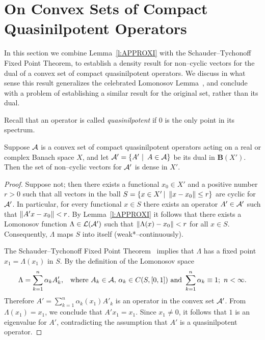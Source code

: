 \goodbreak

\def\baselinestretch{1}

\section{On Convex Sets of Compact Quasinilpotent Operators}

In this section we combine Lemma~\ref{l:APPROXI} with the Schauder--Tychonoff
Fixed Point Theorem, to establish a density result for non--cyclic vectors
for the dual of a convex set of compact quasinilpotent operators. We discuss
in what sense this result generalizes the celebrated Lomonosov
Lemma~\cite{Lom73}, and conclude with a problem of establishing a similar
result for the original set, rather than its dual.

\def\baselinestretch{1.66}
\smallskip

Recall that an operator is called {\em quasinilpotent} if $0$ is the only
point in its spectrum.

\begin{thm}\label{t:QC}
Suppose ${\cal A}$ is a convex set of compact quasinilpotent operators acting on a
real or complex Banach space $X$, and let ${\cal A}'=\left\{A'\,\,|\,\,\,A\in{\cal A}\right\}$ be
its dual in $\mathbf{B}(X')$. Then the set of non--cyclic vectors for ${\cal A}'$
is dense in $X'$.
\end{thm}

\begin{proof}
Suppose not; then there exists a functional $x_0\in{X'}$ and a positive
number $r > 0$ such that all vectors in the ball $S = \left\{x \in X'\,|\,\,
\left\Vert x-x_0\right\Vert \leq r\right\}$ are cyclic for ${\cal A}'$. In particular, for every
functional $x \in S$ there exists an operator $A' \in {\cal A}'$ such that
$\left\Vert A'x - x_0\right\Vert < r$. By Lemma~\ref{l:APPROXI} it follows that there exists
a Lomonosov function $\Lambda\in\cal{L}({\cal A}')$ such that
$\left\Vert\Lambda(x)-x_0\right\Vert<r$ for all $x\in{}S$. Consequently, $\Lambda$ maps $S$
into itself (weak*--continuously).

The Schauder--Tychonoff Fixed Point Theorem~\cite[p.\,456]{DS57} implies that
$\Lambda$ has a fixed point $x_1=\Lambda(x_1)$ in $S$. By the definition of
the Lomonosov space
\[ \Lambda = \sum_{k=1}^n \alpha_k A'_k,
   \,\,\, \text{ where } A_k\in{\cal A}, \,
   \alpha_k\in C(S,[0,1]) \text{ and } \sum_{k=1}^n\alpha_k \equiv 1;
   \,\, n < \infty . \]
Therefore $A'=\sum_{k=1}^n \alpha_k(x_1) A'_k$ is an operator in the convex
set ${\cal A}'$. From $\Lambda(x_1)=x_1$, we conclude that $A'x_1=x_1$. Since
$x_1\neq0$, it follows that $1$ is an eigenvalue for $A'$, contradicting the
assumption that $A'$ is a quasinilpotent operator.
\end{proof}

